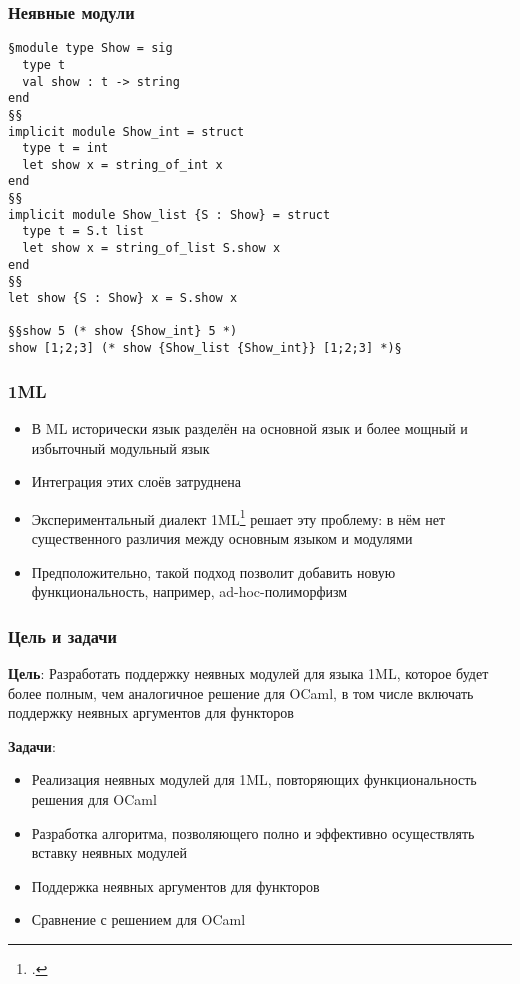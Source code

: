 \documentclass{beamer}
\begin{document}
\lstset{language=caml}
\begin{frame}[fragile]\frametitle{Неявные модули}
\begin{lstlisting}[style=base]
§module type Show = sig
  type t
  val show : t -> string
end
§§
implicit module Show_int = struct 
  type t = int
  let show x = string_of_int x
end
§§
implicit module Show_list {S : Show} = struct 
  type t = S.t list
  let show x = string_of_list S.show x
end
§§
let show {S : Show} x = S.show x 

§§show 5 (* show {Show_int} 5 *)
show [1;2;3] (* show {Show_list {Show_int}} [1;2;3] *)§
\end{lstlisting}
\end{frame}

\begin{frame}\frametitle{1ML}
\begin{itemize}
  \item В ML исторически язык разделён на основной язык и более мощный и избыточный модульный язык
  \item Интеграция этих слоёв затруднена
  \item Экспериментальный диалект 1ML\footcite{1ml} решает эту проблему: в нём нет существенного различия между основным языком и модулями
  \item Предположительно, такой подход позволит добавить новую функциональность, например, ad-hoc-полиморфизм
\end{itemize}
\end{frame}

\begin{frame}\frametitle{Цель и задачи}
\textbf{Цель}: Разработать поддержку неявных модулей для языка 1ML, которое будет более полным, чем аналогичное решение для OCaml, в том числе включать поддержку неявных аргументов для функторов

\textbf{Задачи}:
\begin{itemize}
  \item Реализация неявных модулей для 1ML, повторяющих функциональность решения для OCaml
  \item Разработка алгоритма, позволяющего полно и эффективно осуществлять вставку неявных модулей
  \item Поддержка неявных аргументов для функторов
  \item Сравнение с решением для OCaml
\end{itemize}
\end{frame}
\end{document}
